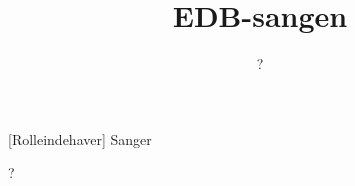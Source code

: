 \documentclass[a4paper,11pt]{article}
\title{EDB-sangen}
\author{?}
\begin{document}
\maketitle

\begin{roles}  
[Rolleindehaver] Sanger
\end{roles}

?
\end{document}
